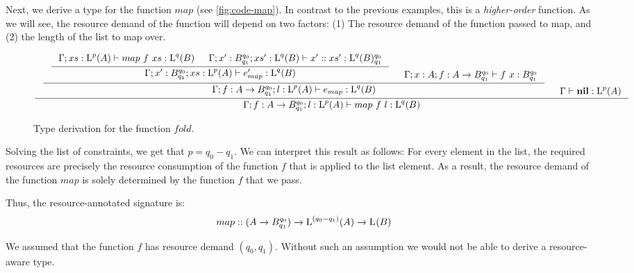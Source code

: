 \begin{example}
   Next, we derive a type for the function \(map\) (see \cref{fig:code-map}). In contrast to the previous examples, this is a \emph{higher-order} function. As we will see, the resource demand of the function will depend on two factors: (1) The resource demand of the function passed to map, and (2) the length of the list to map over.

   \begin{figure}[H]
      \[
         \inference
         {
            \inference
            {
               \inference
               {
                  \typing{\Gamma;xs:\ralist{p}{A}}{map~f~xs}{\ralist{q}{B}}
                  &
                  \typing{\Gamma;x':\ratype{B}{q_0}{q_1};xs':\ralist{q}{B}}{\cons{x'}{xs'}}{\ratype{\ralist{q}{B}}{q_0}{q_1}}
               }
               {
                  \typing{\Gamma;x':\ratype{B}{q_0}{q_1};xs:\ralist{p}{A}}{e_{map}'}{\ralist{q}{B}}
               }
               &
               \typing{\Gamma;x:A;f:\rafunc{A}{B}{q_0}{q_1}}{f~x}{\ratype{B}{q_0}{q_1}}
            }
            {
               \typing{\Gamma;f:\rafunc{A}{B}{q_0}{q_1};l:\ralist{p}{A}}{e_{map}}{\ralist{q}{B}}
            }
            &
            \typing{\Gamma}{\listnil}{\ralist{p}{A}}
         }
         {
            \typing{\Gamma;f:\rafunc{A}{B}{q_0}{q_1};l:\ralist{p}{A}}{map~f~l}{\ralist{q}{B}}
         }
      \]
   \caption{Type derivation for the function \(fold\).}
   \label{fig:derivation-fold}
   \end{figure}

Solving the list of constraints, we get that \(p = q_0 - q_1\). We can interpret this result as follows: For every element in the list, the required resources are precisely the resource consumption of the function \(f\) that is applied to the list element. As a result, the resource demand of the function \(map\) is solely determined by the function \(f\) that we pass.

Thus, the resource-annotated signature is:
\[
   map :: (A \to B ^{q_0}_{q_1}) \to \text{L}^{(q_0 - q_1)}(A) \to \text{L}^{}(B)
\]

\end{example}

\begin{remark}
   We assumed that the function \(f\) has resource demand \((q_0, q_1)\). Without such an assumption we would not be able to derive a resource-aware type.
\end{remark}

